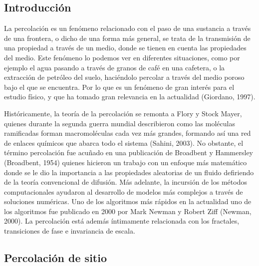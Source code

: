 \documentclass{article}
\begin{document}
\vspace{-1cm}
\begin{multicols}{2}

\section{Introducción}


La percolación es un fenómeno relacionado con el paso de una sustancia a través de una frontera, o dicho de una forma más general, se trata de la transmisión de una propiedad a través de un medio, donde se tienen en cuenta las propiedades del medio. Este fenómeno lo podemos ver en diferentes situaciones, como por ejemplo el agua pasando a través de granos de café en una cafetera, o la extracción de petróleo del suelo, haciéndolo percolar a través del medio poroso bajo el que se encuentra.  Por lo que es un fenómeno de gran interés para el estudio físico, y que ha tomado gran relevancia en la actualidad (Giordano, 1997).  


Históricamente, la teoría de la percolación se remonta a Flory y Stock Mayer, quienes durante la segunda guerra mundial describieron como las moléculas ramificadas forman macromoléculas cada vez más grandes, formando así una red de enlaces químicos que abarca todo el sistema (Sahini, 2003). No obstante, el término percolación fue acuñado en una publicación de Broadbent y Hammersley (Broadbent, 1954) quienes hicieron un trabajo con un enfoque más matemático donde se le dio la importancia a las propiedades aleatorias de un fluido defiriendo de la teoría convencional de difusión. Más adelante, la incursión de los métodos computacionales ayudaron al desarrollo de modelos más complejos a través de soluciones numéricas. Uno de los algoritmos más rápidos en la actualidad uno de los algoritmos fue publicado en 2000 por Mark Newman y Robert Ziff (Newman, 2000). La percolación está además íntimamente relacionada con los  fractales, transiciones de fase e invariancia de escala. 


\subsection{Percolación de sitio}


\end{multicols}
\end{document}
